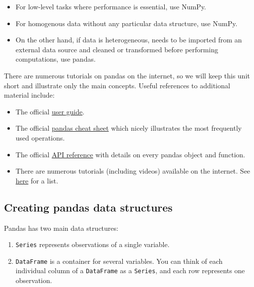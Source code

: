 \documentclass{scrartcl}
\providecommand{\tightlist}{%
      \setlength{\itemsep}{0pt}\setlength{\parskip}{0pt}}
\begin{document}
\begin{itemize}
\tightlist
\item
  For low-level tasks where performance is essential, use NumPy.
\item
  For homogenous data without any particular data structure, use NumPy.
\item
  On the other hand, if data is heterogeneous, needs to be imported from
  an external data source and cleaned or transformed before performing
  computations, use pandas.
\end{itemize}

There are numerous tutorials on pandas on the internet, so we will keep
this unit short and illustrate only the main concepts. Useful references
to additional material include:

\begin{itemize}
\tightlist
\item
  The official
  \href{https://pandas.pydata.org/docs/user_guide/index.html}{user
  guide}.
\item
  The official
  \href{https://pandas.pydata.org/Pandas_Cheat_Sheet.pdf}{pandas cheat
  sheet} which nicely illustrates the most frequently used operations.
\item
  The official
  \href{https://pandas.pydata.org/docs/reference/index.html}{API
  reference} with details on every pandas object and function.
\item
  There are numerous tutorials (including videos) available on the
  internet. See
  \href{https://pandas.pydata.org/docs/getting_started/tutorials.html}{here}
  for a list.
\end{itemize}


\hypertarget{creating-pandas-data-structures}{%
\subsection{Creating pandas data
structures}\label{creating-pandas-data-structures}}

Pandas has two main data structures:

\begin{enumerate}
\def\labelenumi{\arabic{enumi}.}
\tightlist
\item
  \texttt{Series} represents observations of a single variable.
\item
  \texttt{DataFrame} is a container for several variables. You can think
  of each individual column of a \texttt{DataFrame} as a
  \texttt{Series}, and each row represents one observation.
\end{enumerate}
\end{document}
